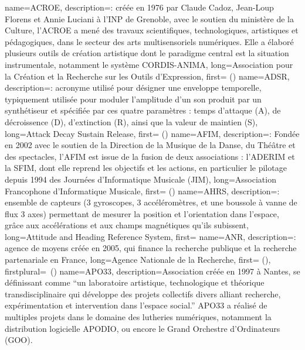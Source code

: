 {
    name={ACROE},
    description={\textit{}: créée en 1976 par Claude Cadoz, Jean-Loup Florens et Annie Luciani à l’INP de Grenoble, avec le soutien du ministère de la Culture, l'ACROE a mené des travaux scientifiques, technologiques, artistiques et pédagogiques, dans le secteur des arts multisensoriels numériques. Elle a élaboré plusieurs outils de création artistique dont le paradigme central est la situation instrumentale, notamment le système \gls{CORDIS-ANIMA}},
    long={Association pour la Création et la Recherche sur les Outils d'Expression},
    first={ ()}
}
{
    name={ADSR},
    description={\textit{}: acronyme utilisé pour désigner une enveloppe temporelle, typiquement utilisée pour moduler l'amplitude d'un son produit par un synthétiseur et spécifiée par ces quatre paramètres : temps d'attaque (A), de décroissence (D), d'extinction (R), ainsi que la valeur de maintien (S)},
    long={Attack Decay Sustain Release},
    first={ ()}
}
{
    name={AFIM},
    description={\textit{}: Fondée en 2002 avec le soutien de la Direction de la Musique de la Danse, du Théâtre et des spectacles, l’AFIM est issue de la fusion de deux associations : l’ADERIM et la SFIM, dont elle reprend les objectifs et les actions, en particulier le pilotage depuis 1994 des Journées d'Informatique Musicale (JIM)},
    long={Association Francophone d'Informatique Musicale},
    first={ ()}
}
{
    name={AHRS},
    description={\textit{}: ensemble de capteurs (3 gyroscopes, 3 accéléromètres, et une boussole à vanne de flux 3 axes) permettant de mesurer la position et l'orientation dans l'espace, grâce aux accélérations et aux champs magnétiques qu'ils subissent},
    long={Attitude and Heading Reference System},
    first={}
}
{
    name={ANR},
    description={\textit{}: agence de moyens créée en 2005, qui finance la recherche publique et la recherche partenariale en France},
    long={Agence Nationale de la Recherche},
    first={ ()},
    firstplural={\glspluralsuffix\ (\glspluralsuffix)}
}
{
    name={APO33},
    description={Association créée en 1997 à Nantes, se définissant comme ``un laboratoire artistique, technologique et théorique transdisciplinaire qui développe des projets collectifs divers alliant recherche, expérimentation et intervention dans l’espace social.'' APO33 a réalisé de multiples projets dans le domaine des lutheries numériques, notamment la distribution logicielle APODIO, ou encore le Grand Orchestre d'Ordinateurs (GOO).}
}

